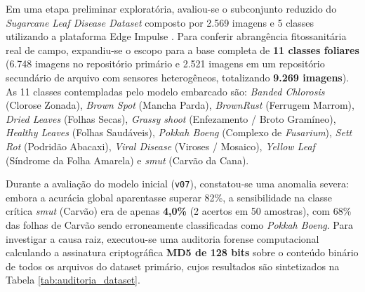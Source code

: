 \documentclass[12pt]{article}
\begin{document}
Em uma etapa preliminar exploratória, avaliou-se o subconjunto reduzido do \textit{Sugarcane Leaf Disease Dataset} \parencite{sugarcaneDataset} composto por 2.569 imagens e 5 classes utilizando a plataforma Edge Impulse \parencite{edgeimpulse2024}. Para conferir abrangência fitossanitária real de campo, expandiu-se o escopo para a base completa de \textbf{11 classes foliares} (6.748 imagens no repositório primário e 2.521 imagens em um repositório secundário de arquivo com sensores heterogêneos, totalizando \textbf{9.269 imagens}). As 11 classes contempladas pelo modelo embarcado são: \textit{Banded Chlorosis} (Clorose Zonada), \textit{Brown Spot} (Mancha Parda), \textit{BrownRust} (Ferrugem Marrom), \textit{Dried Leaves} (Folhas Secas), \textit{Grassy shoot} (Enfezamento / Broto Gramíneo), \textit{Healthy Leaves} (Folhas Saudáveis), \textit{Pokkah Boeng} (Complexo de \textit{Fusarium}), \textit{Sett Rot} (Podridão Abacaxi), \textit{Viral Disease} (Viroses / Mosaico), \textit{Yellow Leaf} (Síndrome da Folha Amarela) e \textit{smut} (Carvão da Cana).

Durante a avaliação do modelo inicial (\texttt{v07}), constatou-se uma anomalia severa: embora a acurácia global aparentasse superar 82\%, a sensibilidade na classe crítica \textit{smut} (Carvão) era de apenas \textbf{4,0\%} (2 acertos em 50 amostras), com 68\% das folhas de Carvão sendo erroneamente classificadas como \textit{Pokkah Boeng}. Para investigar a causa raiz, executou-se uma auditoria forense computacional calculando a assinatura criptográfica \textbf{MD5 de 128 bits} sobre o conteúdo binário de todos os arquivos do dataset primário, cujos resultados são sintetizados na Tabela \ref{tab:auditoria_dataset}.
\end{document}
